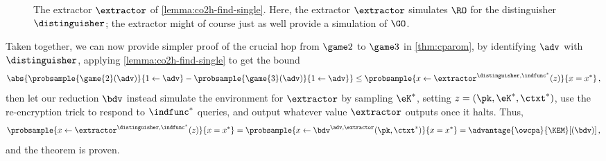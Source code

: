       \begin{figure}[t]
      	\begin{center}
      	\end{center}
      	\caption{\label{fig:co2h-extractor}
          The extractor $\extractor$ of \cref{lemma:co2h-find-single}.
          Here, the extractor $\extractor$ simulates $\RO$ for the distinguisher
          $\distinguisher$; the extractor might of course just as well provide a
          simulation of $\GO$.
        }
      \end{figure}

    Taken together, we can now provide simpler proof of the crucial hop
      from $\game 2$ to $\game 3$ in \cref{thm:cparom}, by identifying $\adv$
      with $\distinguisher$, applying \cref{lemma:co2h-find-single} to get the
      bound
      \[
        \abs{\probsample{\game{2}(\adv)}{1 \gets \adv}
          - \probsample{\game{3}(\adv)}{1 \gets \adv}}
        \leq \probsample{x \gets \extractor^{\distinguisher, \indfunc^*}(z)}{x = x^*}\, ,
      \]
      then let our reduction $\bdv$ instead simulate the environment for
      $\extractor$ by sampling $\eK^*$, setting $z = (\pk, \eK^*, \ctxt^*)$, 
      use the re-encryption trick to respond to $\indfunc^*$ queries, and output
      whatever value $\extractor$ outputs once it halts. Thus,
      \[
        \probsample{x \gets \extractor^{\distinguisher, \indfunc^*}(z)}{x = x^*}
        = \probsample{x \gets \bdv^{\adv, \extractor}(\pk, \ctxt^*)}{x = x^*}
        = \advantage{\owcpa}{\KEM}[(\bdv)]\, ,
      \]
      and the theorem is proven.

